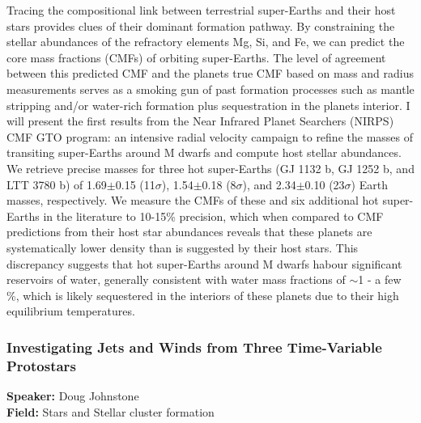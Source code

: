 Tracing the compositional link between terrestrial super-Earths and their host stars provides clues of their dominant formation pathway. By constraining the stellar abundances of the refractory elements Mg, Si, and Fe, we can predict the core mass fractions (CMFs) of orbiting super-Earths. The level of agreement between this predicted CMF and the planets true CMF based on mass and radius measurements serves as a smoking gun of past formation processes such as mantle stripping and/or water-rich formation plus sequestration in the planets interior. I will present the first results from the Near Infrared Planet Searchers (NIRPS) CMF GTO program: an intensive radial velocity campaign to refine the masses of transiting super-Earths around M dwarfs and compute host stellar abundances. We retrieve precise masses for three hot super-Earths (GJ 1132 b, GJ 1252 b, and LTT 3780 b) of 1.69$\pm$0.15 (11$\sigma$), 1.54$\pm$0.18 (8$\sigma$), and 2.34$\pm$0.10 (23$\sigma$) Earth masses, respectively. We measure the CMFs of these and six additional hot super-Earths in the literature to 10-15\% precision, which when compared to CMF predictions from their host star abundances reveals that these planets are systematically lower density than is suggested by their host stars. This discrepancy suggests that hot super-Earths around M dwarfs habour significant reservoirs of water, generally consistent with water mass fractions of $\sim$1 - a few \%, which is likely sequestered in the interiors of these planets due to their high equilibrium temperatures.

\hypertarget{abstract-talk-76}{}\label{abstract-page-talk-76}
\subsubsection*{Investigating Jets and Winds from Three Time-Variable Protostars}
\textbf{Speaker:} Doug Johnstone\\
\textbf{Field:} Stars and Stellar cluster formation


